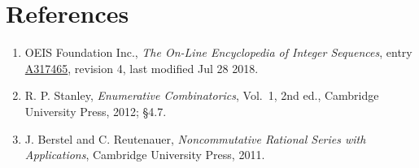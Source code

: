 \documentclass[11pt]{article}
\theoremstyle{definition}
\begin{document}
\section{References}

\begin{enumerate}

\item OEIS Foundation Inc., \emph{The On-Line Encyclopedia of Integer Sequences}, entry \href{https://oeis.org/A317465}{A317465}, revision 4, last modified Jul 28 2018.

\item R. P. Stanley, \emph{Enumerative Combinatorics}, Vol.~1, 2nd ed., Cambridge University Press, 2012; \S4.7.

\item J. Berstel and C. Reutenauer, \emph{Noncommutative Rational Series with Applications}, Cambridge University Press, 2011.

\end{enumerate}
\end{document}
